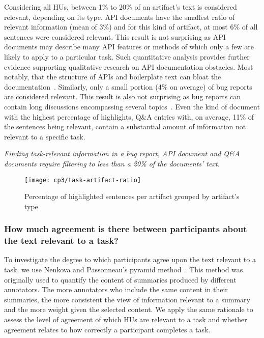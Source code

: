 Considering all HUs, between 1\% to 20\% of an artifact's text is considered relevant, depending on its type.
API documents have the smallest ratio of
relevant information (mean of 3\%) and for this kind of artifact,
at most 6\% of all sentences were considered relevant.
This result is not surprising as API documents may describe many API features or
methods of which only a few are likely to apply to
a particular task.
Such quantitative analysis provides further
evidence supporting qualitative research on API
documentation obstacles.
Most notably, that the structure of APIs
and boilerplate text can bloat the documentation~\cite{robillard2011field, Aghajani2019}.
Similarly, only a small portion (4\% on average) of
bug reports are considered relevant.
This result is also not
surprising as bug reports can contain long discussions encompassing
several topics~\cite{Breu2010, Rastkar2010}.
Even the kind of document with the highest
percentage of highlights, Q\&A entries with, on average, 11\%
of the sentences being relevant,
contain a substantial amount of information not relevant to a
specific task. 







\medskip
\begin{bluequote}
    \textit{Finding task-relevant information in a bug report,
    API document and Q\&A documents require filtering to less than
    a 20\% of the documents' text.}
\end{bluequote}



\begin{figure}
    \centering
    \texttt{[image: cp3/task-artifact-ratio]}
    \caption{Percentage of highlighted sentences per artifact grouped by artifact's type}
    \label{fig:task-artifact-ratio}
\end{figure}

\subsubsection{How much agreement is there between participants about the text relevant to a task?}
\label{cp3:agreement}



To investigate the degree to which participants agree upon
the text relevant to a task, we use Nenkova and Passonneau's
pyramid method~\cite{Nenkova2004}. This method was originally used
to quantify the content of summaries produced by different annotators.
The more annotators who include the same content in their summaries,
the more consistent the view of information relevant to a summary and
the more weight given the selected content. We apply the same rationale
to assess the level of agreement of which HUs are relevant to a task
and whether agreement relates to how correctly
a participant completes a task.




